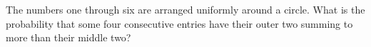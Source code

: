 The numbers one through six are arranged uniformly around a circle. What is the probability that some four consecutive entries have their outer two summing to more than their middle two?
